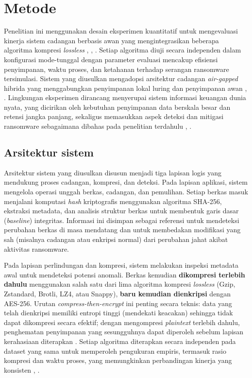 \documentclass{iaesarticle}
\begin{document}
\section{Metode}
\label{sec:metode}
Penelitian ini menggunakan desain eksperimen kuantitatif untuk mengevaluasi kinerja sistem cadangan berbasis awan yang mengintegrasikan beberapa algoritma kompresi \textit{lossless} \cite{22}, \cite{24}, \cite{25}. Setiap algoritma diuji secara independen dalam konfigurasi mode-tunggal dengan parameter evaluasi mencakup efisiensi penyimpanan, waktu proses, dan ketahanan terhadap serangan ransomware tersimulasi. Sistem yang diusulkan mengadopsi arsitektur cadangan \textit{air-gapped} hibrida yang menggabungkan penyimpanan lokal luring dan penyimpanan awan \cite{21}, \cite{27}. Lingkungan eksperimen dirancang menyerupai sistem informasi keuangan dunia nyata, yang dicirikan oleh kebutuhan penyimpanan data berskala besar dan retensi jangka panjang, sekaligus memasukkan aspek deteksi dan mitigasi ransomware sebagaimana dibahas pada penelitian terdahulu \cite{28}, \cite{29}.

\subsection{Arsitektur sistem}
Arsitektur sistem yang diusulkan disusun menjadi tiga lapisan logis yang mendukung proses cadangan, kompresi, dan deteksi. Pada lapisan aplikasi, sistem mengelola operasi unggah berkas, cadangan, dan pemulihan. Setiap berkas masuk menjalani komputasi \textit{hash} kriptografis menggunakan algoritma SHA-256, ekstraksi metadata, dan analisis struktur berkas untuk membentuk garis dasar (\textit{baseline}) integritas. Informasi ini disimpan sebagai referensi untuk mendeteksi perubahan berkas di masa mendatang dan untuk membedakan modifikasi yang sah (misalnya cadangan atau enkripsi normal) dari perubahan jahat akibat aktivitas ransomware.

Pada lapisan perlindungan dan kompresi, sistem melakukan inspeksi metadata awal untuk mendeteksi potensi anomali. Berkas kemudian \textbf{dikompresi terlebih dahulu} menggunakan salah satu dari lima algoritma kompresi \textit{lossless} (Gzip, Zstandard, Brotli, LZ4, atau Snappy), \textbf{baru kemudian dienkripsi} dengan AES-256. Urutan \textit{compress-then-encrypt} ini penting secara teknis: data yang telah dienkripsi memiliki entropi tinggi (mendekati keacakan) sehingga tidak dapat dikompresi secara efektif; dengan mengompresi \textit{plaintext} terlebih dahulu, penghematan penyimpanan yang sesungguhnya dapat diperoleh sebelum lapisan kerahasiaan diterapkan \cite{9}. Setiap algoritma diterapkan secara independen pada dataset yang sama untuk memperoleh pengukuran empiris, termasuk rasio kompresi dan waktu proses, yang memungkinkan perbandingan kinerja yang konsisten \cite{10}, \cite{36}.
\end{document}
